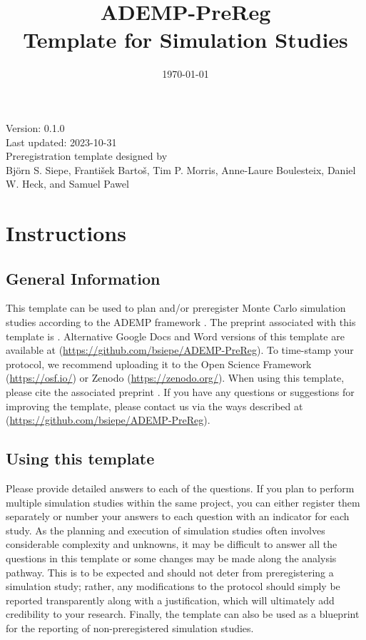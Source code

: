\documentclass[12pt]{article}
\title{ADEMP-PreReg \\ Template for Simulation Studies}
\date{\today}
\begin{document}
\begin{titlepage}
    \maketitle
    \thispagestyle{empty}
    \vfill
    \centering
    Version: 0.1.0 \\
    Last updated: 2023-10-31 \\
    Preregistration template designed by \\
    Björn S. Siepe, František Bartoš, Tim P. Morris, Anne-Laure Boulesteix, Daniel W. Heck, and Samuel Pawel \\
    \vfill
\end{titlepage}

\newpage



\section{Instructions}
\subsection*{General Information}
This template can be used to plan and/or preregister Monte Carlo simulation studies according to the ADEMP framework \parencite{Morris2019}. The preprint associated with this template is \parencite{Siepe2023}. Alternative Google Docs and Word versions of this template are available at (\url{https://github.com/bsiepe/ADEMP-PreReg}). To time-stamp your protocol, we recommend uploading it to the Open Science Framework (\url{https://osf.io/}) or Zenodo (\url{https://zenodo.org/}). When using this template, please cite the associated preprint \parencite{Siepe2023}. If you have any questions or suggestions for improving the template, please contact us via the ways described at (\url{https://github.com/bsiepe/ADEMP-PreReg}). \\

\subsection*{Using this template}
Please provide detailed answers to each of the questions. If you plan to perform multiple simulation studies within the same project, you can either register them separately or number your answers to each question with an indicator for each study. As the planning and execution of simulation studies often involves considerable complexity and unknowns, it may be difficult to answer all the questions in this template or some changes may be made along the analysis pathway. This is to be expected and should not deter from preregistering a simulation study; rather, any modifications to the protocol should simply be reported transparently along with a justification, which will ultimately add credibility to your research. Finally, the template can also be used as a blueprint for the reporting of non-preregistered simulation studies.
\end{document}

